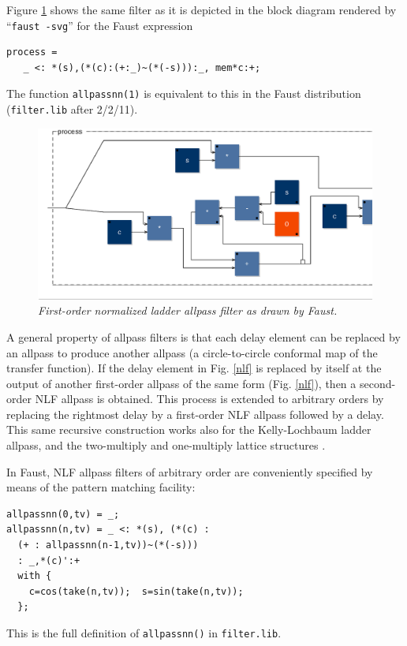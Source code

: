\documentclass[twoside,a4paper]{article}
\begin{document}
Figure \ref{nlf1} shows the same filter as it is depicted in the block diagram
rendered by ``\texttt{faust -svg}'' for the Faust expression
\begin{verbatim}
process = 
   _ <: *(s),(*(c):(+:_)~(*(-s))):_, mem*c:+;
\end{verbatim}
The function \texttt{allpassnn(1)} is equivalent to this in the Faust
distribution (\texttt{filter.lib} after 2/2/11).

\begin{figure}[ht]
\centerline{\includegraphics[scale=0.33]{eps/nlf1.eps}}
\caption{\label{nlf1}{\it First-order normalized ladder allpass filter as drawn by Faust.}}
\end{figure}

A general property of allpass filters is that each delay element can
be replaced by an allpass to produce another allpass (a
circle-to-circle conformal map of the transfer function).  If the
delay element in Fig.{} \ref{nlf} is replaced by itself at the output
of another first-order allpass of the same form (Fig.{} \ref{nlf}),
then a second-order NLF allpass is obtained.  This process is extended
to arbitrary orders by replacing the rightmost delay by a first-order
NLF allpass followed by a delay.  This same recursive construction
works also for the Kelly-Lochbaum ladder allpass, and the
two-multiply and one-multiply lattice structures \cite{MG,PASP}.

In Faust, NLF allpass filters of arbitrary order are conveniently
specified by means of the pattern matching facility:
\begin{samepage}
\begin{verbatim}
allpassnn(0,tv) = _;
allpassnn(n,tv) = _ <: *(s), (*(c) : 
  (+ : allpassnn(n-1,tv))~(*(-s))) 
  : _,*(c)':+
  with { 
    c=cos(take(n,tv));  s=sin(take(n,tv)); 
  };
\end{verbatim}
\end{samepage}
This is the full definition of \texttt{allpassnn()} in 
\texttt{filter.lib}.
\end{document}
